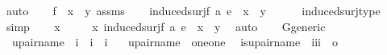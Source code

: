 \begin{isabellebody}
\ auto\isanewline
\ \ \isamarkupfalse%
\ {\isacartoucheopen}f\ {\isacharbackquote}{\kern0pt}\ x\ {\isacharequal}{\kern0pt}\ y{\isacartoucheclose}\ assms\isanewline
\ \ \isamarkupfalse%
\ {\isachardoublequoteopen}induced{\isacharunderscore}{\kern0pt}surj{\isacharparenleft}{\kern0pt}f{\isacharcomma}{\kern0pt}\ a{\isacharcomma}{\kern0pt}\ e{\isacharparenright}{\kern0pt}\ {\isacharbackquote}{\kern0pt}\ x\ {\isacharequal}{\kern0pt}\ y{\isachardoublequoteclose}\isanewline
\ \ \ \ \isamarkupfalse%
\ induced{\isacharunderscore}{\kern0pt}surj{\isacharunderscore}{\kern0pt}type\ \isamarkupfalse%
\ simp\isanewline
\ \ \isamarkupfalse%
\ {\isacartoucheopen}x{\isasymin}{\isasymalpha}{\isacartoucheclose}\ \isamarkupfalse%
\isanewline
\ \ \ \ {\isachardoublequoteopen}{\isasymexists}x{\isasymin}{\isasymalpha}{\isachardot}{\kern0pt}\ induced{\isacharunderscore}{\kern0pt}surj{\isacharparenleft}{\kern0pt}f{\isacharcomma}{\kern0pt}\ a{\isacharcomma}{\kern0pt}\ e{\isacharparenright}{\kern0pt}\ {\isacharbackquote}{\kern0pt}\ x\ {\isacharequal}{\kern0pt}\ y{\isachardoublequoteclose}\ \isamarkupfalse%
\ auto\isanewline
{}\isamarkupfalse%
%
\endisatagproof
{\isafoldproof}%
%
\isadelimproof
\isanewline
%
\endisadelimproof
\ \ \isanewline
{}\isamarkupfalse%
\ G{\isacharunderscore}{\kern0pt}generic\ \isanewline
{}\isanewline
\isanewline
{}\isamarkupfalse%
\isanewline
\ \ upair{\isacharunderscore}{\kern0pt}name\ {\isacharcolon}{\kern0pt}{\isacharcolon}{\kern0pt}\ {\isachardoublequoteopen}i\ {\isasymRightarrow}\ i\ {\isasymRightarrow}\ i{\isachardoublequoteclose}\ \isanewline
\ \ {\isachardoublequoteopen}upair{\isacharunderscore}{\kern0pt}name{\isacharparenleft}{\kern0pt}{\isasymtau}{\isacharcomma}{\kern0pt}{\isasymrho}{\isacharparenright}{\kern0pt}\ {\isasymequiv}\ {\isacharbraceleft}{\kern0pt}{\isasymlangle}{\isasymtau}{\isacharcomma}{\kern0pt}one{\isasymrangle}{\isacharcomma}{\kern0pt}{\isasymlangle}{\isasymrho}{\isacharcomma}{\kern0pt}one{\isasymrangle}{\isacharbraceright}{\kern0pt}{\isachardoublequoteclose}\isanewline
\isanewline
{}\isamarkupfalse%
\isanewline
\ \ is{\isacharunderscore}{\kern0pt}upair{\isacharunderscore}{\kern0pt}name\ {\isacharcolon}{\kern0pt}{\isacharcolon}{\kern0pt}\ {\isachardoublequoteopen}{\isacharbrackleft}{\kern0pt}i{\isacharcomma}{\kern0pt}i{\isacharcomma}{\kern0pt}i{\isacharbrackright}{\kern0pt}\ {\isasymRightarrow}\ o{\isachardoublequoteclose}\ \isanewline

\end{isabellebody}
